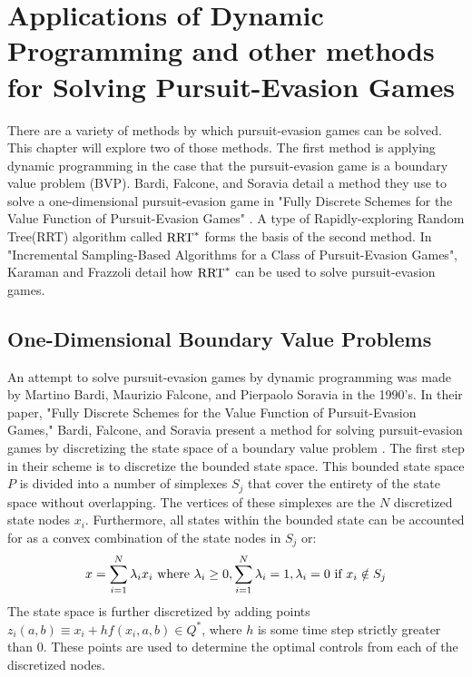 \chapter{Applications of Dynamic Programming and other methods for Solving Pursuit-Evasion Games}\label{chp:app}
There are a variety of methods by which pursuit-evasion games can be solved. This chapter will explore two of those methods. The first method is applying dynamic programming in the case that the pursuit-evasion game is a boundary value problem (BVP). Bardi, Falcone, and Soravia detail a method they use to solve a one-dimensional pursuit-evasion game in "Fully Discrete Schemes for the Value Function of Pursuit-Evasion Games" \cite{bardi2}. A type of Rapidly-exploring Random Tree(RRT) algorithm called $\textnormal{RRT}^*$ forms the basis of the second method. In "Incremental Sampling-Based Algorithms for a Class of Pursuit-Evasion Games", Karaman and Frazzoli detail how $\textnormal{RRT}^*$ can be used to solve pursuit-evasion games.  

\section{One-Dimensional Boundary Value Problems}\label{1dbvp}

An attempt to solve pursuit-evasion games by dynamic programming was made by Martino Bardi, Maurizio Falcone, and Pierpaolo Soravia in the 1990's. In their paper, "Fully Discrete Schemes for the Value Function of Pursuit-Evasion Games," Bardi, Falcone, and Soravia present a method for solving pursuit-evasion games by discretizing the state space of a boundary value problem \cite{bardi2}. The first step in their scheme is to discretize the bounded state space. This bounded state space $P$ is divided into a number of simplexes ${S_j}$ that cover the entirety of the state space without overlapping. The vertices of these simplexes are the $N$ discretized state nodes $x_i$. Furthermore, all states within the bounded state can be accounted for as a convex combination of the state nodes in $S_j$ or:
\begin{equation}
x= \sum_{i=1}^{N} \lambda_i x_i \textnormal{ where } \lambda_i \ge 0,  \sum_{i=1}^{N}\lambda_i=1,\lambda_i = 0 \textnormal{ if } x_i\notin S_j
\end{equation}
The state space is further discretized by adding points $z_i(a,b) \equiv x_i+hf(x_i,a,b) \in Q^*$, where $h$ is some time step strictly greater than 0. These points are used to determine the optimal controls from each of the discretized nodes.

